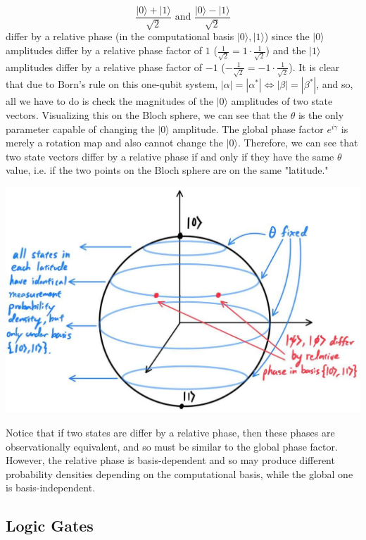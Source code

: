 \documentclass{article}
\theoremstyle{definition}
\begin{document}
    \[\frac{|0\rangle + |1\rangle}{\sqrt{2}} \text{ and } \frac{|0\rangle - |1\rangle}{\sqrt{2}}\]
    differ by a relative phase (in the computational basis $|0\rangle, |1\rangle$) since the $|0\rangle$ amplitudes differ by a relative phase factor of $1$ ($ \frac{1}{\sqrt{2}} = 1 \cdot \frac{1}{\sqrt{2}}$) and the $|1\rangle$ amplitudes differ by a relative phase factor of $-1$ ($-\frac{1}{\sqrt{2}} = -1 \cdot \frac{1}{\sqrt{2}}$). It is clear that due to Born's rule on this one-qubit system, $|\alpha| = |\alpha^*| \iff |\beta| = |\beta^*|$, and so, all we have to do is check the magnitudes of the $|0\rangle$ amplitudes of two state vectors. Visualizing this on the Bloch sphere, we can see that the $\theta$ is the only parameter capable of changing the $|0\rangle$ amplitude. The global phase factor $e^{i\gamma}$ is merely a rotation map and also cannot change the $|0\rangle$. Therefore, we can see that two state vectors differ by a relative phase if and only if they have the same $\theta$ value, i.e. if the two points on the Bloch sphere are on the same "latitude."

    \begin{center} 
      \includegraphics[scale=0.3]{img/Bloch_Sphere_latitude.jpg}
    \end{center}

    Notice that if two states are differ by a relative phase, then these phases are observationally equivalent, and so must be similar to the global phase factor. However, the relative phase is basis-dependent and so may produce different probability densities depending on the computational basis, while the global one is basis-independent. 

  \subsection{Logic Gates} 
\end{document}
